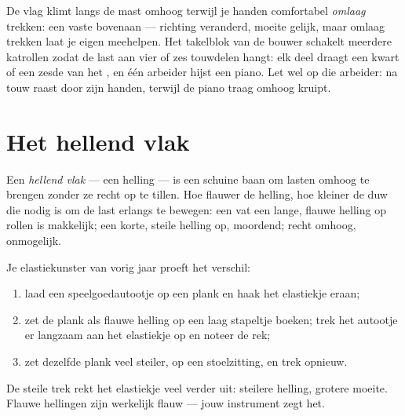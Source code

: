 \begin{example}\label{ex:g5:simple-machines:pulleywork}
De vlag klimt langs de mast omhoog terwijl je handen comfortabel
\emph{omlaag} trekken: een vaste  bovenaan --- richting veranderd,
moeite gelijk, maar omlaag trekken laat je eigen  meehelpen. Het
takelblok van de bouwer schakelt meerdere katrollen zodat de last aan
vier of zes touwdelen hangt: elk deel draagt een kwart of een zesde
van het , en één arbeider hijst een piano. Let wel op die
arbeider:  na  touw raast door zijn handen, terwijl de
piano traag omhoog kruipt.
\end{example}

\section{Het hellend vlak}

\begin{definition}\label{def:g5:simple-machines:ramp}
Een \emph{hellend vlak} --- een helling --- is
een schuine baan om lasten omhoog te brengen zonder ze recht op te
tillen. Hoe flauwer de helling, hoe kleiner de duw die nodig is om de
last erlangs te bewegen: een vat een lange, flauwe helling op rollen
is makkelijk; een korte, steile helling op, moordend; recht omhoog,
onmogelijk.
\end{definition}

\begin{method}\label{met:g5:simple-machines:measure}
Je elastiekunster van vorig jaar proeft het verschil:
\begin{enumerate}
  \item laad een speelgoedautootje op een plank en haak het
        elastiekje eraan;
  \item zet de plank als flauwe helling op een laag stapeltje boeken;
        trek het autootje er langzaam aan het elastiekje op en noteer
        de rek;
  \item zet dezelfde plank veel steiler, op een stoelzitting, en trek
        opnieuw.
\end{enumerate}
De steile trek rekt het elastiekje veel verder uit: steilere helling,
grotere moeite. Flauwe hellingen zijn werkelijk flauw --- jouw
instrument zegt het.
\end{method}


